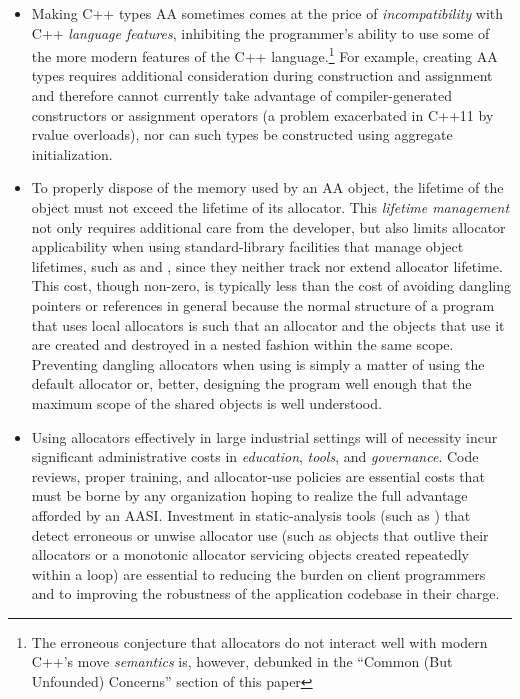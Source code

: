 \begin{itemize}
\item Making C++ types AA sometimes comes at the price of \emph{incompatibility} with C++
\emph{language features}, inhibiting the programmer’s ability to use some of the more
modern features of the C++ language.\footnote{The erroneous conjecture that allocators
do not interact well with modern C++’s move \emph{semantics} is,
however, debunked in the “Common (But Unfounded) Concerns” section of this paper} For example, creating AA types
requires additional consideration during construction and assignment and
therefore cannot currently take advantage of compiler-generated constructors
or assignment operators (a problem exacerbated in C++11 by rvalue
overloads), nor can such types be constructed using aggregate initialization.

\item To properly dispose of the memory used by an AA object, the lifetime of the
object must not exceed the lifetime of its allocator. This \emph{lifetime management}
not only requires additional care from the developer, but also limits allocator
applicability when using standard-library facilities that manage object
lifetimes, such as  and , since they neither track nor
extend allocator lifetime. This cost, though non-zero, is typically less than the
cost of avoiding dangling pointers or references in general because the normal
structure of a program that uses local allocators is such that an allocator and
the objects that use it are created and destroyed in a nested fashion within
the same scope. Preventing dangling allocators when using  is
simply a matter of using the default allocator or, better, designing the program
well enough that the maximum scope of the shared objects is well understood.

\item Using allocators effectively in large industrial settings will of necessity incur
significant administrative costs in \emph{education}, \emph{tools}, and \emph{governance}. Code
reviews, proper training, and allocator-use policies are essential costs that
must be borne by any organization hoping to realize the full advantage
afforded by an AASI. Investment in static-analysis tools (such as )
that detect erroneous or unwise allocator use (such as objects that outlive
their allocators or a monotonic allocator servicing objects created repeatedly
within a loop) are essential to reducing the burden on client programmers and
to improving the robustness of the application codebase in their charge.

\end{itemize}

